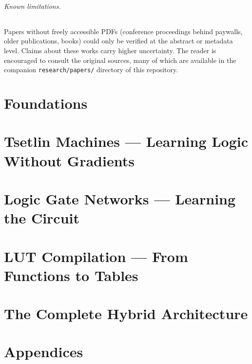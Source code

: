 \documentclass[11pt,a4paper,twoside,openright]{book}
\begin{document}
\paragraph{Known limitations.}
Papers without freely accessible PDFs (conference proceedings behind
paywalls, older publications, books) could only be verified at the
abstract or metadata level. Claims about these works carry higher
uncertainty. The reader is encouraged to consult the original sources,
many of which are available in the companion \texttt{research/papers/}
directory of this repository.

\tableofcontents

\mainmatter

\part{Foundations}
\label{part:foundations}






\part{Tsetlin Machines --- Learning Logic Without Gradients}
\label{part:tsetlin}





\part{Logic Gate Networks --- Learning the Circuit}
\label{part:lgn}




\part{LUT Compilation --- From Functions to Tables}
\label{part:lut}




\part{The Complete Hybrid Architecture}
\label{part:hybrid}





\backmatter

\appendix
\part*{Appendices}




\printbibliography[heading=bibintoc]
\end{document}

